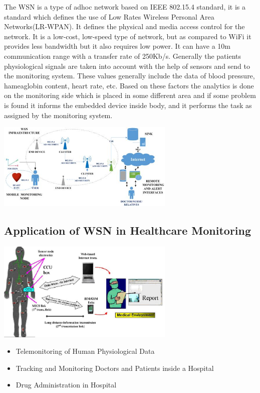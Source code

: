 \documentclass[conference]{IEEEtran}
\begin{document}
\begin{flushleft}
The WSN is a type of adhoc network based on IEEE 802.15.4 standard, it is a standard which defines the use of Low Rates Wireless Personal Area Networks(LR-WPAN). It defines the physical and media access control for the network. It is a low-cost, low-speed type of network, but as compared to WiFi it provides less bandwidth but it also requires low power. It can have a 10m communication range with a transfer rate of 250Kb/s.
\linebreak
Generally the patients physiological signals are taken into account with the help of sensors and send to the monitoring system. These values generally include the data of blood pressure, hameaglobin content, heart rate, etc. Based on these factors the analytics is done on the monitoring side which is placed in some different area and if some problem is found it informs the embedded device inside body, and it performs the task as assigned by the monitoring system.
\end{flushleft}
\includegraphics[width=8.5cm]{cluster}
\subsection{Application of WSN in Healthcare Monitoring}
\begin{flushleft}
\includegraphics[width=8.5cm]{WSN}
\begin{itemize}
  \item Telemonitoring of Human Physiological Data
  \item Tracking and Monitoring Doctors and Patients inside a Hospital
  \item Drug Administration in Hospital
\end{itemize}
\end{flushleft}
\end{document}
